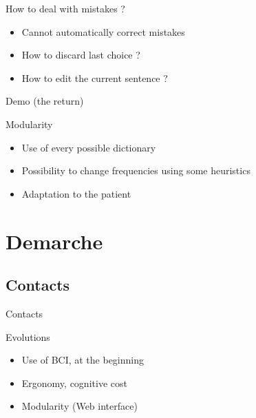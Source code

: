 \documentclass[notes]{beamer}
\begin{document}
\begin{frame}{How to deal with mistakes ?}
	\begin{itemize}
		\item Cannot automatically correct mistakes
		\item How to discard last choice ?
		\item How to edit the current sentence ?
	\end{itemize}
\end{frame}

\begin{frame}{Demo (the return)}
\end{frame}

\begin{frame}{Modularity}
	\begin{center}
		\begin{itemize}
			\item Use of every possible dictionary %
			\item Possibility to change frequencies using some heuristics
			\item Adaptation to the patient
		\end{itemize}
	\end{center}
\end{frame}

\section{Demarche}
\subsection{Contacts}
\begin{frame}{Contacts}
	\begin{center}
	\end{center}
\end{frame}

\begin{frame}{Evolutions}
	\begin{center}
		\begin{itemize}
			\item Use of BCI, at the beginning
			\item Ergonomy, cognitive cost %
			\item Modularity (Web interface)
		\end{itemize}
	\end{center}
\end{frame}
\end{document}
